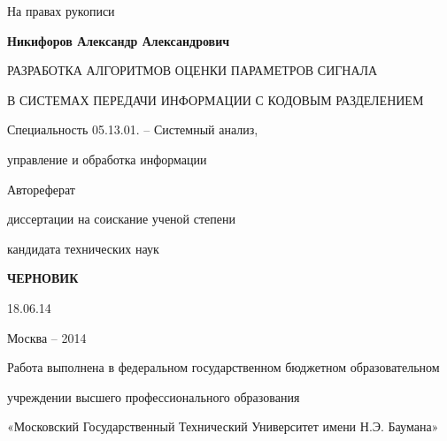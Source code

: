 \hfill На правах рукописи

\vspace{\baselineskip}
\vspace{\baselineskip}
\vspace{\baselineskip}

\noindent\centerline{\bf{Никифоров Александр Александрович}}

\vspace{\baselineskip}
\vspace{\baselineskip}
\vspace{\baselineskip}

\noindent\centerline{РАЗРАБОТКА АЛГОРИТМОВ ОЦЕНКИ ПАРАМЕТРОВ СИГНАЛА}
\noindent\centerline{В СИСТЕМАХ ПЕРЕДАЧИ ИНФОРМАЦИИ С КОДОВЫМ РАЗДЕЛЕНИЕМ}

\vspace{\baselineskip}
\vspace{\baselineskip}
\vspace{\baselineskip}

\noindent\centerline{Специальность 05.13.01. – Системный анализ,}
\noindent\centerline{управление и обработка информации}

\vspace{\baselineskip}
\vspace{\baselineskip}
\vspace{\baselineskip}

\noindent\centerline{Автореферат} 
\noindent\centerline{диссертации на соискание ученой степени}
\noindent\centerline{кандидата технических наук}


\vspace{\baselineskip}
\vspace{\baselineskip}
\vspace{\baselineskip}
\noindent\centerline{\bf{ЧЕРНОВИК}}
\noindent\centerline{18.06.14}

\vfill
\noindent\centerline{Москва – 2014}

\newpage

\noindent\centerline{Работа выполнена в федеральном государственном бюджетном образовательном}
\noindent\centerline{учреждении высшего профессионального образования}
\noindent\centerline{«Московский Государственный Технический Университет имени Н.Э. Баумана»}
\vspace{\baselineskip}

